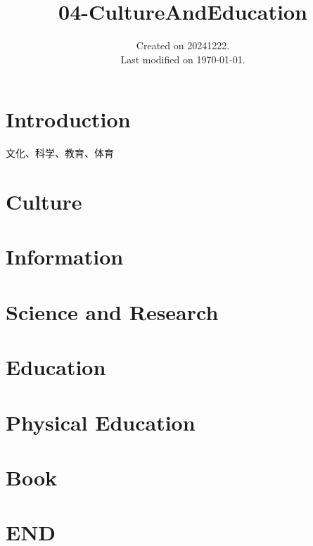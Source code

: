 \documentclass[UTF8]{../ApplicationUniverse}
\begin{document}
\title{04-CultureAndEducation}
\date{Created on 20241222.\\   Last modified on \today.}
\maketitle
\tableofcontents


\chapter{Introduction}


文化、科学、教育、体育



\chapter{Culture}%


\chapter{Information}%


\chapter{Science and Research}%


\chapter{Education}%


\chapter{Physical Education}%


\chapter{Book}%












\chapter{END}
\end{document}

